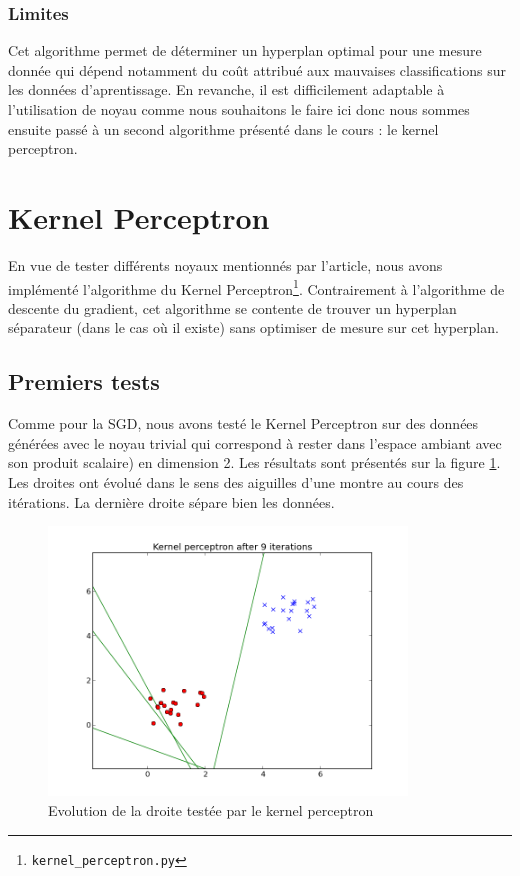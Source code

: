 \documentclass{article}
\begin{document}
\subsubsection{Limites}
Cet algorithme permet de déterminer un hyperplan optimal pour une mesure donnée qui dépend notamment du coût attribué aux mauvaises classifications sur les données d'aprentissage. En revanche, il est difficilement adaptable à l'utilisation de noyau comme nous souhaitons le faire ici donc nous sommes ensuite passé à un second algorithme présenté dans le cours : le kernel perceptron.

\section{Kernel Perceptron}
\label{kernelperceptron}
En vue de tester différents noyaux mentionnés par l'article, nous avons implémenté l'algorithme du Kernel Perceptron\footnote{\texttt{kernel\_perceptron.py}}. Contrairement à l'algorithme de descente du gradient, cet algorithme se contente de trouver un hyperplan séparateur (dans le cas où il existe) sans optimiser de mesure sur cet hyperplan.

\subsection{Premiers tests}
Comme pour la SGD, nous avons testé le Kernel Perceptron sur des données générées avec le noyau trivial qui correspond à rester dans l'espace ambiant avec son produit scalaire) en dimension 2. Les résultats sont présentés sur la figure \ref{test_kp}. Les droites ont évolué dans le sens des aiguilles d'une montre au cours des itérations. La dernière droite sépare bien les données.

\begin{figure}[!h]
\includegraphics[width=0.85\textwidth]{img/kp_pdf}
\caption{Evolution de la droite testée par le kernel perceptron}\label{test_kp}
\end{figure}
\end{document}
